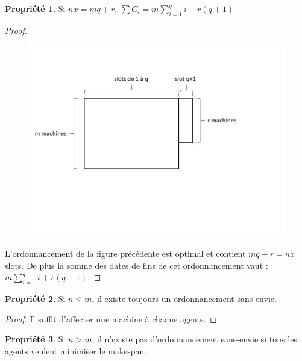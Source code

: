\documentclass[12pt]{article}
\theoremstyle{definition}
\newtheorem{prop}{Propriété}
\begin{document}
\begin{prop}Si $nx = mq+r$, $\sum C_i = m\sum\limits_{i=1}^q i +r(q+1)$
\end{prop}
\begin{proof}
\begin{figure}[H]
\includegraphics[scale = 0.6]{somme_opt.jpg}
\end{figure}
L'ordonnancement de la figure précédente est optimal et contient $mq+r = nx$ slots. De plus la somme des dates de fins de cet ordonnancement vaut : $m\sum\limits_{i=1}^q i +r(q+1)$.
\end{proof}

\begin{prop}
Si $n\leq m$, il existe toujours un ordonnancement sans-envie.
\end{prop}
\begin{proof}
Il suffit d'affecter une machine à chaque agents.
\end{proof}

\begin{prop}
Si $n > m$, il n'existe pas d'ordonnancement sans-envie si tous les agents veulent minimiser le makespan.
\end{prop}
\end{document}
